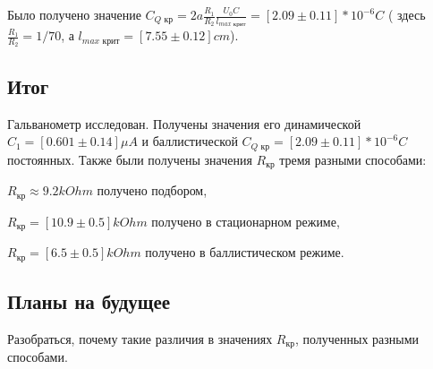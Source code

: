 \documentclass[a4paper,12pt]{article}
\begin{document}
Было получено значение \textbf{$C_{Q\text{ кр}} = 2a \frac{R_1}{R_2}\frac{U_0C}{l_{max \text{ крит}}} = [2.09 \pm 0.11]*10^{-6}C$} ( здесь $\frac{R_1}{R_2} = 1/70$, а $l_{max \text{ крит}} = [7.55 \pm 0.12]cm$).


\bigskip

\subsection*{Итог}
\bigskip

Гальванометр исследован. Получены значения его динамической $C_1 = [0.601 \pm 0.14] \mu A$ и баллистической $C_{Q\text{ кр}} = [2.09 \pm 0.11]*10^{-6}C$ постоянных. Также были получены значения $R_\text{кр}$ тремя разными способами:\medskip

$R_\text{кр} \approx 9.2 kOhm$ получено подбором,\medskip

$R_\text{кр} =  [10.9 \pm 0.5]kOhm$ получено в стационарном режиме,\medskip

$R_\text{кр} = [6.5 \pm 0.5] kOhm$ получено в баллистическом режиме.\medskip

\subsection*{Планы на будущее}
\bigskip

Разобраться, почему такие различия в значениях $R_\text{кр}$, полученных разными способами.
 
\end{document}
